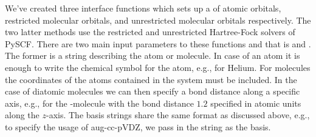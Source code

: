         We've created three interface functions which sets up a
         of atomic orbitals, restricted molecular orbitals,
        and unrestricted molecular orbitals respectively.
        The two latter methods use the restricted and unrestricted Hartree-Fock
        solvers of PySCF.
        There are two main input parameters to these functions and that is
         and .
        The former is a string describing the atom or molecule.
        In case of an atom it is enough to write the chemical symbol for the
        atom, e.g.,  for Helium.
        For molecules the coordinates of the atoms contained in the system must
        be included.
        In the case of diatomic molecules we can then specify a bond distance
        along a specific axis, e.g.,  for the
        -molecule with the bond distance $1.2$ specified in atomic units
        along the $z$-axis.
        The basis strings share the same format as discussed above, e.g., to
        specify the usage of aug-cc-pVDZ, we pass in the string
         as the basis.


